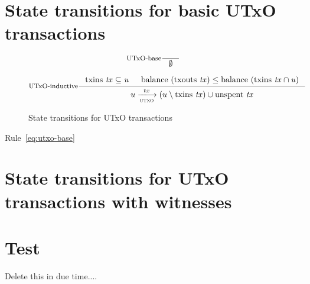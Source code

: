 \documentclass[11pt,a4paper]{article}
\newcommand{\transitionarrow}[2]{\xlongrightarrow[\textsc{#1}]{#2}}
\newcommand{\txins}[1]{\text{txins}\ \mathit{#1}}
\newcommand{\txouts}[1]{\text{txouts}\ \mathit{#1}}
\newcommand{\balance}[1]{\text{balance}\ \mathit{#1}}
\newcommand{\unspent}[1]{\text{unspent}\ \mathit{#1}}
\begin{document}
\section{State transitions for basic UTxO transactions}
\label{sec:state-trans-basic}



\begin{figure}[h]

  \centering
  \begin{equation}\label{eq:utxo-base}
    \inference[UTxO-base]
    {}
    {\emptyset}
  \end{equation}
  
  \begin{equation}\label{eq:utxo-inductive}
    \inference[UTxO-inductive]
    { \txins{tx} \subseteq \mathit{u}
      & \balance{(\txouts{tx})} \leq \balance{(\txins{tx} \cap u)}
    }
    {u \transitionarrow{utxo}{tx} (u \setminus \txins{tx}) \cup \unspent{tx}}
  \end{equation}
  \caption{State transitions for UTxO transactions}
  \label{fig:state-trans-utxo}
\end{figure}

Rule~\ref{eq:utxo-base}

\section{State transitions for UTxO transactions with witnesses}
\label{sec:state-trans-utxo}

\section{Test}
\label{sec:test}

Delete this in due time....
\end{document}
